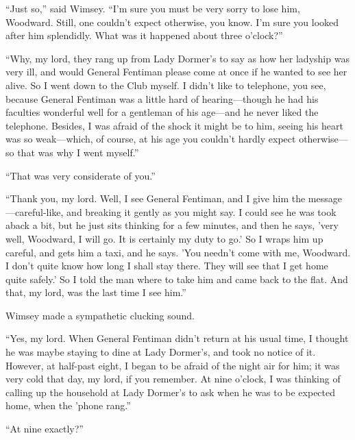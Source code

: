 \enquote{Just so,} said Wimsey. \enquote{I'm sure you must be very sorry to lose him, Woodward. Still, one couldn't expect otherwise, you know. I'm sure you looked after him splendidly. What was it happened about three o'clock?}

\enquote{Why, my lord, they rang up from Lady Dormer's to say as how her ladyship was very ill, and would General Fentiman please come at once if he wanted to see her alive. So I went down to the Club myself. I didn't like to telephone, you see, because General Fentiman was a little hard of hearing\allowbreak---\allowbreak though he had his faculties wonderful well for a gentleman of his age\allowbreak---\allowbreak and he never liked the telephone. Besides, I was afraid of the shock it might be to him, seeing his heart was so weak\allowbreak---\allowbreak which, of course, at his age you couldn't hardly expect otherwise\allowbreak---\allowbreak so that was why I went myself.}

\enquote{That was very considerate of you.}

\enquote{Thank you, my lord. Well, I see General Fentiman, and I give him the message\allowbreak---\allowbreak careful-like, and breaking it gently as you might say. I could see he was took aback a bit, but he just sits thinking for a few minutes, and then he says, 'very well, Woodward, I will go. It is certainly my duty to go.' So I wraps him up careful, and gets him a taxi, and he says. 'You needn't come with me, Woodward. I don't quite know how long I shall stay there. They will see that I get home quite safely.' So I told the man where to take him and came back to the flat. And that, my lord, was the last time I see him.}

Wimsey made a sympathetic clucking sound.

\enquote{Yes, my lord. When General Fentiman didn't return at his usual time, I thought he was maybe staying to dine at Lady Dormer's, and took no notice of it. However, at half-past eight, I began to be afraid of the night air for him; it was very cold that day, my lord, if you remember. At nine o'clock, I was thinking of calling up the household at Lady Dormer's to ask when he was to be expected home, when the 'phone rang.}

\enquote{At nine exactly?}

